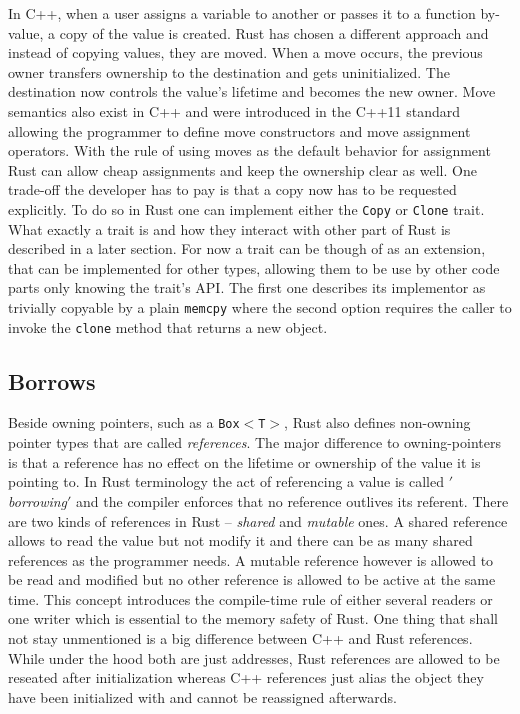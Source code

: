 In C++, when a user assigns a variable to another or passes it to a function by-value, a copy of the value is created. Rust has chosen a different approach and instead of copying values, they are moved. When a move occurs,  the previous owner transfers ownership to the destination and gets uninitialized. The destination now controls the value's lifetime and becomes the new owner. Move semantics also exist in C++ and were introduced in the C++11 standard allowing the programmer to define move constructors and move assignment operators. \cite{CppMove} With the rule of using moves as the default behavior for assignment Rust can allow cheap assignments and keep the ownership clear as well. One trade-off the developer has to pay is that a copy now has to be requested explicitly. To do so in Rust one can implement either the \texttt{Copy} or \texttt{Clone} trait. What exactly a trait is and how they interact with other part of Rust is described in a later section. For now a trait can be though of as an extension, that can be implemented for other types, allowing them to be use by other code parts only knowing the trait's \ac{API}. The first one describes its implementor as trivially copyable by a plain \texttt{memcpy} where the second option requires the caller to invoke the \texttt{clone} method that returns a new object. \cite[Chapter 4. Ownership]{ProRus}

\subsection{Borrows}

Beside owning pointers, such as a \texttt{Box$<$T$>$}, Rust also defines non-owning pointer types that are called \textit{references}. The major difference to owning-pointers is that a reference has no effect on the lifetime or ownership of the value it is pointing to. In Rust terminology the act of referencing a value is called \textit{$'$borrowing$'$} and the compiler enforces that no reference outlives its referent. There are two kinds of references in Rust -- \textit{shared} and \textit{mutable} ones. A shared reference allows to read the value but not modify it and there can be as many shared references as the programmer needs. A mutable reference however is allowed to be read and modified but no other reference is allowed to be active at the same time. This concept introduces the compile-time rule of either several readers or one writer which is essential to the memory safety of Rust. One thing that shall not stay unmentioned is a big difference between C++ and Rust references. While under the hood both are just addresses, Rust references are allowed to be reseated after initialization whereas C++ references just alias the object they have been initialized with and cannot be reassigned afterwards. \cite[Chapter 5. References]{ProRus}

